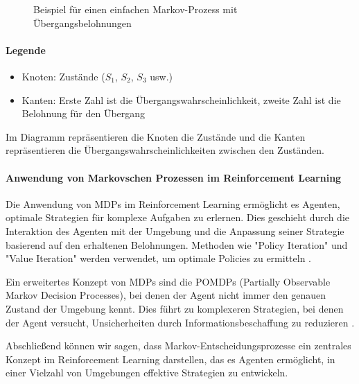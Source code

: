 \begin{figure}[h]
    \centering
    \caption{Beispiel für einen einfachen Markov-Prozess mit Übergangsbelohnungen}
    \label{fig:MarkovProzessBelohnungen}
\end{figure}

\paragraph{Legende}
\begin{itemize}
    \item Knoten: Zustände ($S_1$, $S_2$, $S_3$ usw.)
    \item Kanten: Erste Zahl ist die Übergangswahrscheinlichkeit, zweite Zahl ist die Belohnung für den Übergang
\end{itemize}

Im Diagramm repräsentieren die Knoten die Zustände und die Kanten repräsentieren die Übergangswahrscheinlichkeiten zwischen den Zuständen. 

\paragraph{Anwendung von Markovschen Prozessen im Reinforcement Learning}

Die Anwendung von MDPs im Reinforcement Learning ermöglicht es Agenten, optimale Strategien für komplexe Aufgaben zu erlernen. Dies geschieht durch die Interaktion des Agenten mit der Umgebung und die Anpassung seiner Strategie basierend auf den erhaltenen Belohnungen. Methoden wie "Policy Iteration" und "Value Iteration" werden verwendet, um optimale Policies zu ermitteln \cite{russell2021ai}.

Ein erweitertes Konzept von MDPs sind die POMDPs (Partially Observable Markov Decision Processes), bei denen der Agent nicht immer den genauen Zustand der Umgebung kennt. Dies führt zu komplexeren Strategien, bei denen der Agent versucht, Unsicherheiten durch Informationsbeschaffung zu reduzieren \cite{morales2020grokking}.

Abschließend können wir sagen, dass Markov-Entscheidungsprozesse ein zentrales Konzept im Reinforcement Learning darstellen, das es Agenten ermöglicht, in einer Vielzahl von Umgebungen effektive Strategien zu entwickeln.



